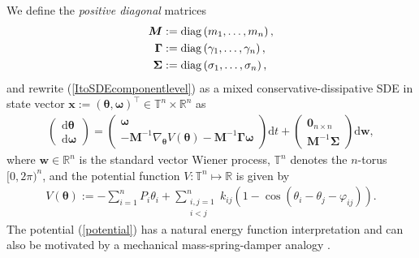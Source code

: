 \documentclass[10pt,twocolumn]{IEEEtran}
\begin{document}
We define the \emph{positive diagonal} matrices
\begin{align*}
\bm{M} &:= {\rm{diag}}\left(m_{1},\hdots,m_{n}\right), \nonumber\\
\bm{\Gamma} &:= {\rm{diag}}\left(\gamma_{1},\hdots,\gamma_{n}\right),\nonumber\\
\bm{\Sigma} &:= {\rm{diag}}\left(\sigma_{1},\hdots,\sigma_{n}\right),
\end{align*}
and rewrite (\ref{ItoSDEcomponentlevel}) as a mixed conservative-dissipative SDE in state vector $\bm{x} := (\bm{\theta},\bm{\omega})^{\top} \in \mathbb{T}^{n} \times \mathbb{R}^{n}$ as
\begin{align}
\begin{pmatrix}
{\mathrm{d}}\bm{\theta}\\
{\mathrm{d}}\bm{\omega}	
\end{pmatrix}
\! = \!\begin{pmatrix}
\bm{\omega}\\
-\bm{M}^{-1}\nabla_{\bm{\theta}}V(\bm{\theta}) -\bm{M}^{-1}\bm{\Gamma}\bm{\omega}  	
\end{pmatrix}{\mathrm{d}}t + \!\begin{pmatrix}
 \bm{0}_{n\times n}\\
 \bm{M}^{-1}\bm{\Sigma}	
 \end{pmatrix}{\mathrm{d}}\bm{w},
\label{ItoSDEvectorlevel}
\end{align}
where 
$\bm{w}\in\mathbb{R}^{n}$ is the standard vector Wiener process, $\mathbb{T}^{n}$ denotes the $n$-torus $[0,2\pi)^{n}$, and the potential function $V : \mathbb{T}^{n} \mapsto \mathbb{R}$ is given by
\begin{align}
V(\bm{\theta}) := -\displaystyle\sum_{i=1}^{n} P_{i}\theta_{i} + \!\displaystyle\sum_{\substack{i,j=1\\i<j}}^{n}\!k_{ij}\left(1 - \cos(\theta_{i}-\theta_{j}-\varphi_{ij})\right).
\label{potential}	
\end{align}
The potential (\ref{potential}) has a natural energy function interpretation and can also be motivated by a mechanical mass-spring-damper analogy \cite{dorfler2013synchronization,ishizaki2018}. %
\end{document}
